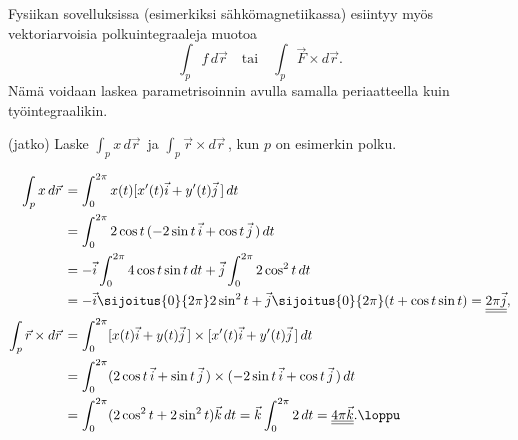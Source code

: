 Fysiikan sovelluksissa (esimerkiksi sähkömagnetiikassa) esiintyy myös vektoriarvoisia 
polkuintegraaleja muotoa
\[
\int_p f\,d\vec r\quad\text{tai}\quad\int_p \vec F\times d\vec r.
\]
Nämä voidaan laskea parametrisoinnin avulla samalla periaatteella kuin työintegraalikin.
\jatko \begin{Exa} (jatko) Laske $\int_p x\,d\vec r\,$ ja $\int_p \vec r \times d\vec r\,$,
kun $p$ on esimerkin polku.
\end{Exa}
\ratk
\begin{align*}
\int_p x\,d\vec r\,
&= \int_0^{2\pi} x(t)[x'(t)\vec i+y'(t)\vec j\,]\,dt \\
&= \int_0^{2\pi} 2\cos t\,(-2\sin t\,\vec i+\cos t\,\vec j\,)\,dt \\
&= -\vec i\int_0^{2\pi} 4\cos t\sin t\,dt + \vec j\int_0^{2\pi} 2\cos^2 t\,dt \\
&= -\vec i\sijoitus{0}{2\pi} 2\sin^2 t 
   +\vec j\sijoitus{0}{2\pi}(t+\cos t\sin t)
 = \underline{\underline{2\pi\vec j}}, \\
\int_p \vec r\times d\vec r\, 
&= \int_0^{2\pi} [x(t)\vec i+y(t)\vec j\,]\times[x'(t)\vec i+y'(t)\vec j\,]\,dt \\
&= \int_0^{2\pi}(2\cos t\,\vec i+\sin t\,\vec j\,)\times
               (-2\sin t\,\vec i+\cos t\,\vec j\,)\,dt \\
&= \int_0^{2\pi} (2\cos^2 t+2\sin^2 t)\vec k\, dt
 = \vec k \int_0^{2\pi} 2\,dt
 =\underline{\underline{4\pi\vec k}}. \loppu
\end{align*}

